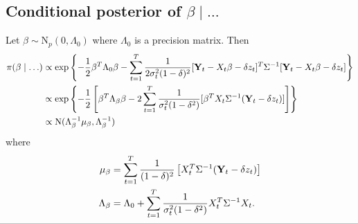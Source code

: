 \subsection*{Conditional posterior of $\beta \mid \ldots$}\label{s:betapost}
Let $\beta \sim \mbox{N}_{p}(0, \Lambda_0)$ where $\Lambda_0$ is a precision matrix. Then 
\begin{align*}
    \pi(\beta \mid \ldots) & \propto \exp \left\{ - \frac{ 1 }{ 2 } \beta^T \Lambda_0 \beta - \sum_{t = 1 }^T \frac{ 1 }{ 2 \sigma_t^2 (1 - \delta)^2 } [\mbox{\bf Y}_t - X_t \beta - \delta z_t]^T \Sigma^{-1} [\mbox{\bf Y}_t - X_t \beta - \delta z_t] \right\}\\
     & \propto \exp \left\{ -\frac{ 1 }{ 2 } \left[ \beta^T \Lambda_\beta \beta  - 2 \sum_{ t = 1 }^T \frac{ 1 }{ \sigma_t^2 (1 - \delta^2) } [ \beta^T X_t \Sigma^{-1} (\mbox{\bf Y}_t - \delta z_t )] \right] \right\}\\
     & \propto \mbox{N} ( \Lambda_\beta^{-1} \mu_\beta , \Lambda_\beta^{-1})
\end{align*}
where
\begin{align*}
    \mu_\beta &= \sum_{t=1}^{T}\frac{ 1 }{ (1 - \delta)^2 } \left[ X_t^T \Sigma^{-1} (\mbox{\bf Y}_t - \delta z_t) \right]\\
    \Lambda_\beta &= \Lambda_0 + \sum_{ t = 1 }^{ T} \frac{ 1 }{ \sigma_t^2 (1 - \delta^2) } X_t^T \Sigma^{-1} X_t. 
\end{align*}
